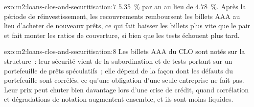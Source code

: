 \begin{solution}{exo:m2:loans-clos-and-securitisation:7}
5.35~\% par an au lieu de 4.78~\%. Après la période de réinvestissement, les recouvrements remboursent les
billets AAA au lieu d'acheter de nouveaux prêts, ce qui fait baisser les billets plus vite que le pair et
fait monter les ratios de couverture, si bien que les tests échouent plus tard.
\end{solution}

\begin{solution}{exo:m2:loans-clos-and-securitisation:8}
Les billets AAA du CLO sont notés sur la structure~: leur sécurité vient de la subordination
et de tests portant sur un portefeuille de prêts spéculatifs~; elle dépend de la façon dont les défauts
du portefeuille sont corrélés, ce qu'une obligation d'une seule entreprise ne fait pas. Leur prix peut
chuter bien davantage lors d'une crise de crédit, quand corrélation et dégradations de notation augmentent ensemble, et ils
sont moins liquides.
\end{solution}


